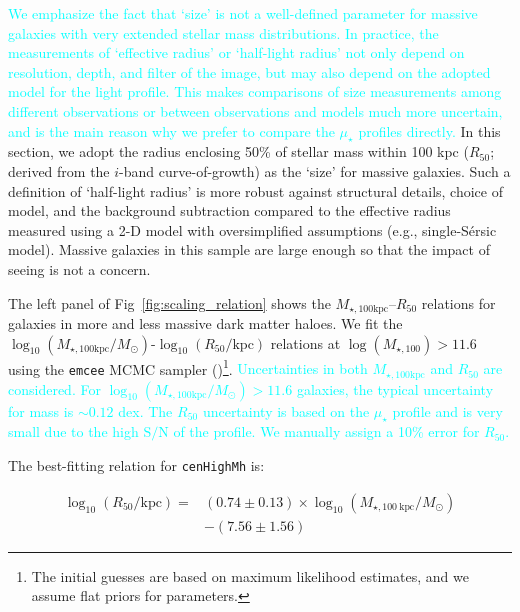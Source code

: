 \documentclass[a4paper,fleqn,usenatbib]{mnras}
\def\ser{{S\'{e}rsic\ }}
\def\rbcg{\texttt{cenHighMh}}
\def\mtot{{$M_{\star,100\mathrm{kpc}}$}}
\def\logmtot{{$\log_{10} (M_{\star,100\mathrm{kpc}}/M_{\odot})$}}
\def\s2n{{$\mathrm{S}/\mathrm{N}$}}
\def\mden{{$\mu_{\star}$}}
\newcommand{\song}[1]{\textcolor{cyan}{#1}}
\begin{document}
    \song{
    We emphasize the fact that `size' is not a well-defined parameter for massive 
    galaxies with very extended stellar mass distributions. 
    In practice, the measurements of `effective radius' or `half-light radius' 
    not only depend on resolution, depth, and filter of the image, but may also 
    depend on the adopted model for the light profile.  
    This makes comparisons of size measurements among different observations 
    or between observations and models much more uncertain, and is the main reason
    why we prefer to compare the \mden{} profiles directly.
    }
    In this section, we adopt the radius enclosing 50\% of stellar mass within 
    100 kpc ($R_{\mathrm{50}}$; derived from the $i$-band curve-of-growth) as the 
    `size' for massive galaxies. 
    Such a definition of `half-light radius' is more robust against structural 
    details, choice of model, and the background subtraction compared to the 
    effective radius measured using a 2-D model with oversimplified assumptions 
    (e.g., single-\ser{} model). 
    Massive galaxies in this sample are large enough so that the impact of seeing 
    is not a concern.
    
    The left panel of Fig~\ref{fig:scaling_relation} shows the 
    \mtot{}--$R_{\mathrm{50}}$ relations for galaxies in more and less massive
    dark matter haloes. 
    We fit the \logmtot{}-$\log_{10} (R_{\mathrm{50}}/\mathrm{kpc})$ relations at 
    $\log(M_{\star,100})>11.6$ using the \texttt{emcee} MCMC sampler 
    (\citealt{Emcee})\footnote{The initial guesses are based on maximum 
    likelihood estimates, and we assume flat priors for parameters.}.
    \song{
    Uncertainties in both \mtot{} and $R_{\mathrm{50}}$ are considered. 
    For \logmtot{}$>11.6$ galaxies, the typical uncertainty for mass is $\sim 0.12$
    dex.  
    The $R_{\mathrm{50}}$ uncertainty is based on the \mden{} profile and
    is very small due to the high \s2n{} of the profile. 
    We manually assign a 10\% error for $R_{\mathrm{50}}$. 
    }
    
    The best-fitting relation for \rbcg{} is:
    
    \begin{equation}
        \begin{aligned}
        \log_{10} (R_{\mathrm{50}}/\mathrm{kpc}) = & (0.74\pm0.13) \times \log_{10} (M_{\star, 100\ \mathrm{kpc}}/M_{\odot}) \\ & -(7.56\pm1.56)
        \end{aligned}
    \end{equation}
\end{document}
